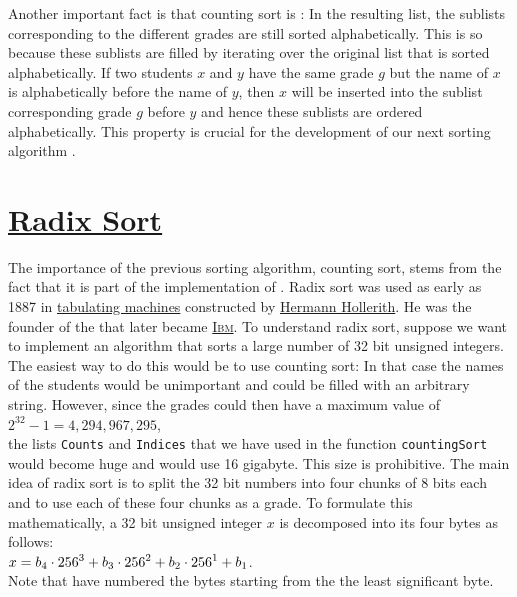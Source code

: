 Another important fact is that counting sort is : In the resulting list, the sublists
corresponding to the different grades are still sorted alphabetically.  This is so because these sublists are
filled by iterating over the original list that is sorted alphabetically.  If two students $x$ and $y$ have the
same grade $g$ but the name of $x$ is alphabetically before the name of $y$, then $x$ will be inserted into the
sublist corresponding grade $g$ before $y$ and hence these sublists are ordered alphabetically.  This property
is crucial for the development of our next sorting algorithm .

\section{\href{https://en.wikipedia.org/wiki/Radix_sort}{Radix Sort}}
The importance of the previous sorting algorithm, counting sort, stems from the fact that it is part of the
implementation of .  Radix sort was used as early as 1887 in
\href{https://en.wikipedia.org/wiki/Tabulating_machine}{tabulating machines} constructed by
\href{https://en.wikipedia.org/wiki/Herman_Hollerith}{Hermann Hollerith}.  He was the founder of
the  that later became \href{https://en.wikipedia.org/wiki/IBM}{\textsc{Ibm}}.
To understand radix sort, suppose we want to implement an algorithm that sorts a large number of 32 bit
unsigned integers.  The easiest way to do this would be to use counting sort:  In that case the names of the
students would be unimportant and could be filled with an arbitrary string.  However, since the grades could then
have a maximum value of 
\\[0.2cm]
\hspace*{1.3cm}
$2^{32} - 1 = 4,294,967,295$,
\\[0.2cm]
the lists \texttt{Counts} and \texttt{Indices} that we have used in the function \texttt{countingSort} would
become huge and would use 16 gigabyte.   This size is prohibitive.  The main idea of radix sort is to split the
32 bit numbers into four chunks of 8 bits each and to use each of these four chunks as a grade.  To formulate this
mathematically, a 32 bit unsigned integer $x$ is decomposed into its four bytes as follows:
\\[0.2cm]
\hspace*{1.3cm}
$\displaystyle x = b_4 \cdot 256^{3} + b_3 \cdot 256^{2} + b_2 \cdot 256^{1} + b_1$.
\\[0.2cm]
Note that have  numbered the bytes starting from the the least significant byte.
